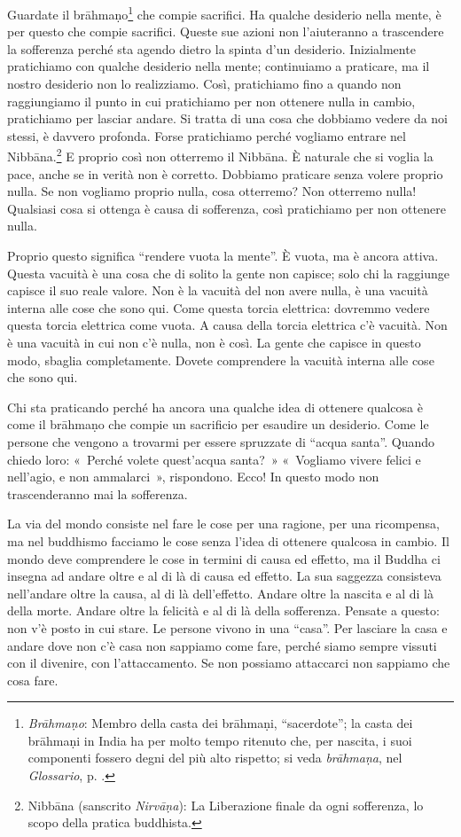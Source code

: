 Guardate il brāhmaṇo\footnote{\emph{Brāhmaṇo}: Membro della casta dei brāhmaṇi,
  ``sacerdote''; la casta dei brāhmaṇi in India ha per molto tempo
  ritenuto che, per nascita, i suoi componenti fossero degni del più
  alto rispetto; si veda \emph{brāhmaṇa}, nel \emph{Glossario}, p. \pageref{glossary-brahmana}.} che
compie sacrifici. Ha qualche desiderio nella mente, è per questo che
compie sacrifici. Queste sue azioni non l'aiuteranno a trascendere la
sofferenza perché sta agendo dietro la spinta d'un desiderio.
Inizialmente pratichiamo con qualche desiderio nella mente; continuiamo
a praticare, ma il nostro desiderio non lo realizziamo. Così,
pratichiamo fino a quando non raggiungiamo il punto in cui pratichiamo
per non ottenere nulla in cambio, pratichiamo per lasciar andare. Si
tratta di una cosa che dobbiamo vedere da noi stessi, è davvero
profonda. Forse pratichiamo perché vogliamo entrare nel
Nibbāna.\footnote{Nibbāna (sanscrito \emph{Nirvāṇa}): La
  Liberazione finale da ogni sofferenza, lo scopo della pratica
  buddhista.} E proprio così non otterremo il Nibbāna. È naturale
che si voglia la pace, anche se in verità non è corretto. Dobbiamo
praticare senza volere proprio nulla. Se non vogliamo proprio nulla,
cosa otterremo? Non otterremo nulla! Qualsiasi cosa si ottenga è causa
di sofferenza, così pratichiamo per non ottenere nulla.

Proprio questo significa ``rendere vuota la mente''. È vuota, ma è
ancora attiva. Questa vacuità è una cosa che di solito la gente non
capisce; solo chi la raggiunge capisce il suo reale valore. Non è la
vacuità del non avere nulla, è una vacuità interna alle cose che sono
qui. Come questa torcia elettrica: dovremmo vedere questa torcia
elettrica come vuota. A causa della torcia elettrica c'è vacuità. Non è
una vacuità in cui non c'è nulla, non è così. La gente che capisce in
questo modo, sbaglia completamente. Dovete comprendere la vacuità
interna alle cose che sono qui.

Chi sta praticando perché ha ancora una qualche idea di ottenere
qualcosa è come il brāhmaṇo che compie un sacrificio per esaudire un
desiderio. Come le persone che vengono a trovarmi per essere spruzzate
di ``acqua santa''. Quando chiedo loro: «~Perché volete quest'acqua
santa?~» «~Vogliamo vivere felici e nell'agio, e non ammalarci~»,
rispondono. Ecco! In questo modo non trascenderanno mai la sofferenza.

La via del mondo consiste nel fare le cose per una ragione, per una
ricompensa, ma nel buddhismo facciamo le cose senza l'idea di ottenere
qualcosa in cambio. Il mondo deve comprendere le cose in termini di
causa ed effetto, ma il Buddha ci insegna ad andare oltre e al di là di
causa ed effetto. La sua saggezza consisteva nell'andare oltre la causa,
al di là dell'effetto. Andare oltre la nascita e al di là della morte.
Andare oltre la felicità e al di là della sofferenza. Pensate a questo:
non v'è posto in cui stare. Le persone vivono in una ``casa''. Per
lasciare la casa e andare dove non c'è casa non sappiamo come fare,
perché siamo sempre vissuti con il divenire, con l'attaccamento. Se non
possiamo attaccarci non sappiamo che cosa fare.

